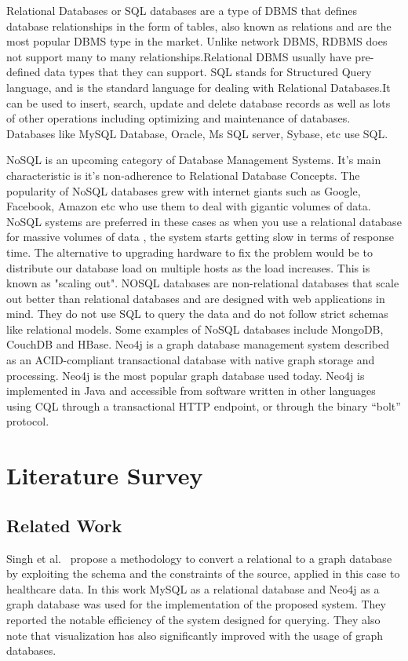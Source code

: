 \documentclass[12pt]{article}
\newcommand{\sectionfontstyle}{\fontsize{16pt}{1em}\usefont{T1}{phv}{b}{n}}
\begin{document}
    Relational Databases or SQL databases are a  type of DBMS that defines database relationships in the form of tables, also known as relations and are the most popular DBMS type in the market. Unlike network DBMS, RDBMS does not support many to many relationships.Relational DBMS usually have pre-defined data types that they can support. SQL stands for Structured Query language, and is the standard language for dealing with Relational Databases.It can be used to insert, search, update and delete database records as well as lots of other operations including optimizing and maintenance of databases. Databases like MySQL Database, Oracle, Ms SQL server, Sybase, etc use SQL.

    NoSQL is an upcoming category of Database Management Systems. It’s main characteristic is it’s non-adherence to Relational Database Concepts. The popularity of NoSQL databases grew with internet giants such as Google, Facebook, Amazon etc who use them to deal with gigantic volumes of data. NoSQL systems are preferred in these cases as when you use a relational database for massive volumes of data , the system starts getting slow in terms of response time. The alternative to upgrading hardware to fix the problem would be to distribute our database load on multiple hosts as the load increases. This is known as "scaling out". NOSQL databases are non-relational databases that scale out better than relational databases and are designed with web applications in mind. They do not use SQL to query the data and do not follow strict schemas like relational models. Some examples of NoSQL databases include MongoDB, CouchDB and HBase.
    Neo4j is a graph database management system described as an ACID-compliant transactional database with native graph storage and processing. Neo4j is the most popular graph database used today. Neo4j is implemented in Java and accessible from software written in other languages using CQL through a transactional HTTP endpoint, or through the binary ``bolt'' protocol.

    \newpage

    \section{\sectionfontstyle Literature Survey}
    \subsection{Related Work}
    Singh et al.~\cite{base_paper} propose a methodology to convert a relational to a graph database by exploiting the schema and the constraints of the source, applied in this case to healthcare data. In this work MySQL as a relational database and Neo4j as a graph database was used for the implementation of the proposed system. They reported the notable efficiency of the system designed for querying. They also note that visualization has also significantly improved with the usage of graph databases.
\end{document}
